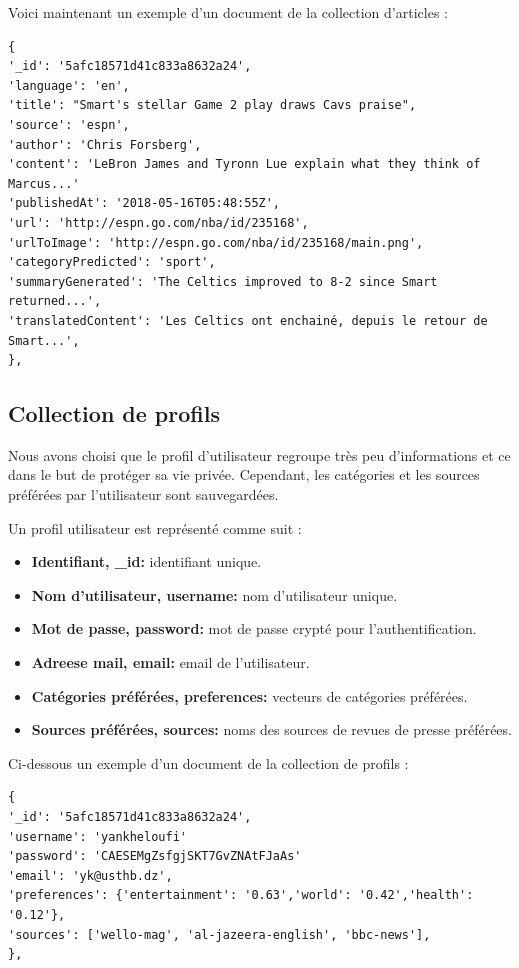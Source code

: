 Voici maintenant un exemple d'un document de la collection d'articles :
\begin{lstlisting}[style=code]
{
'_id': '5afc18571d41c833a8632a24', 
'language': 'en',
'title': "Smart's stellar Game 2 play draws Cavs praise", 
'source': 'espn', 
'author': 'Chris Forsberg', 
'content': 'LeBron James and Tyronn Lue explain what they think of Marcus...'
'publishedAt': '2018-05-16T05:48:55Z', 
'url': 'http://espn.go.com/nba/id/235168',
'urlToImage': 'http://espn.go.com/nba/id/235168/main.png',  
'categoryPredicted': 'sport', 
'summaryGenerated': 'The Celtics improved to 8-2 since Smart returned...', 
'translatedContent': 'Les Celtics ont enchainé, depuis le retour de Smart...', 
},
\end{lstlisting}

\subsection{Collection de profils}\label{profils-collection}
Nous avons choisi que le profil d'utilisateur regroupe très peu d'informations et ce dans le but de protéger sa vie privée. Cependant, les catégories et les sources préférées par l'utilisateur sont sauvegardées. 

Un profil utilisateur est représenté comme suit :
\begin{itemize}
    \item \textbf{Identifiant, \textquotedbl  \_id\textquotedbl : } identifiant unique.
    \item \textbf{Nom d'utilisateur, \textquotedbl  username\textquotedbl : } nom d'utilisateur unique.
    \item \textbf{Mot de passe, \textquotedbl  password\textquotedbl : } mot de passe crypté pour l'authentification.
    \item \textbf{Adreese mail, \textquotedbl  email\textquotedbl : } email de l'utilisateur.
    \item \textbf{Catégories préférées, \textquotedbl  preferences\textquotedbl : } vecteurs de catégories préférées.
    \item \textbf{Sources préférées, \textquotedbl  sources\textquotedbl : } noms des sources de revues de presse préférées. 
\end{itemize}

Ci-dessous un exemple d'un document de la collection de profils :
\begin{lstlisting}[style=code]
{
'_id': '5afc18571d41c833a8632a24', 
'username': 'yankheloufi'
'password': 'CAESEMgZsfgjSKT7GvZNAtFJaAs'
'email': 'yk@usthb.dz',
'preferences': {'entertainment': '0.63','world': '0.42','health': '0.12'},
'sources': ['wello-mag', 'al-jazeera-english', 'bbc-news'],
},
\end{lstlisting}


